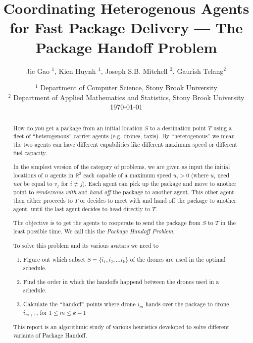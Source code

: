 \documentclass[12pt, english, oneside]{report}
\title{\huge{\bfseries{Coordinating Heterogenous Agents for Fast Package Delivery --- The Package Handoff Problem}}}
\author{Jie Gao $^1$, Kien Huynh $^1$, Joseph S.B. Mitchell $^2$, Gaurish Telang$^2$}
\date{
   \small{$^1$ Department of Computer Science, Stony Brook University \\%
   $^2$ Department of Applied Mathematics and Statistics, Stony Brook University} \\[2ex]%
   \today
}
\begin{document}
\maketitle

\begin{abstract}
How do you get a package from an initial location $S$ to a destination point $T$ using a 
fleet of ``heterogenous'' carrier agents (e.g. drones, taxis). By ``heterogenous'' we mean 
the two agents can have different capabilities like different maximum speed
or different fuel capacity. 

\vspace{2mm}

In the simplest version of the category of problems, 
we are given as input the initial locations of $n$  agents in $\mathbb{R}^2$ 
each capable of a maximum speed $u_i >0$ (where $u_i$ need \textsl{not} be equal to $v_j$ for $i \neq j$). 
Each agent can pick up the package and move to another point to \textit{rendezvous with} and 
\textit{hand off} the 
package to another agent. This other agent then either proceeds to $T$ or decides to meet with 
and hand off the package to another agent, until the last agent decides to head directly to $T$. 

\vspace{2mm}

The objective is to get the agents to cooperate to send the package from $S$ to $T$ in the 
least possible time. We call this the \textit{Package Handoff Problem}. 

\vspace{2mm}

To solve this problem and its various avatars we need to 

\vspace{2mm}

\begin{enumerate}
\item Figure out which subset $S = \{i_1, i_2, \ldots i_k\}$ of the drones are used in the optimal schedule. 
\item Find the order in which the handoffs happend between the drones used in a schedule. 
\item Calculate the ``handoff'' points where drone $i_m$ hands over the package to drone 
      $i_{m+1}$, for $1 \leq m \leq k-1$
\end{enumerate}

\vspace{2mm}

This report is an algorithmic study of various heuristics developed to solve different variants of Package Handoff.

\end{abstract}
\end{document}
